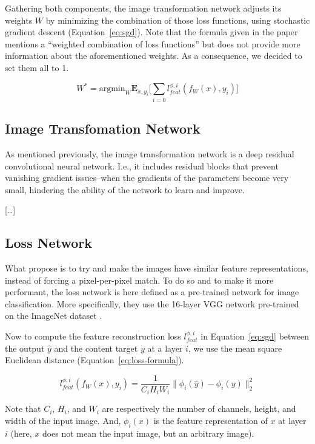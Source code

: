 \documentclass{article}
\begin{document}
{    \bigskip

    Gathering both components, the image transformation network adjusts its weights $W$ by minimizing the combination of those loss functions, using stochastic gradient descent (Equation~\ref{eq:sgd}). Note that the formula given in the paper \citep{sr} mentions a “weighted combination of loss functions” but does not provide more information about the aforementioned weights. As a consequence, we decided to set them all to 1.

    \begin{equation}
        W^* =
        \text{argmin}_W \textbf{E}_{x,y_i}
        \biggl[
            \sum_{i=0} l^{\phi, i}_{feat}(f_W(x), y_i)
            \biggr]
        \label{eq:sgd}
    \end{equation}

    \subsection{Image Transfomation Network}
    \label{subsec:image-transformation-network}

    As mentioned previously, the image transformation network is a deep residual convolutional neural network. I.e., it includes residual blocks that prevent vanishing gradient issues--when the gradients of the parameters become very small, hindering the ability of the network to learn and improve.

    \bigskip

    […]

    \subsection{Loss Network}
    \label{subsec:loss-network}

    What propose \cite{sr} is to try and make the images have similar feature representations, instead of forcing a pixel-per-pixel match. To do so and to make it more performant, the loss network is here defined as a pre-trained network for image classification. More specifically, they use the 16-layer VGG network \citep{vgg} pre-trained on the ImageNet dataset \citep{image-net}.

    Now to compute the feature reconstruction loss $l^{\phi, i}_{feat}$ in Equation~\ref{eq:sgd} between the output $\hat y$ and the content target $y$ at a layer $i$, we use the mean square Euclidean distance (Equation~\ref{eq:loss-formula}).

    \begin{equation}
        l^{\phi, i}_{feat}(f_W(x), y_i) =
        \frac{1}{C_i H_i W_i}
        \lVert
        \phi_i (\hat y) - \phi_i (y)
        \rVert_2^2
        \label{eq:loss-formula}
    \end{equation}

    Note that $C_i$, $H_i$, and $W_i$ are respectively the number of channels, height, and width of the input image. And, $\phi_i (x)$ is the feature representation of $x$ at layer $i$ (here, $x$ does not mean the input image, but an arbitrary image).
}
\end{document}
